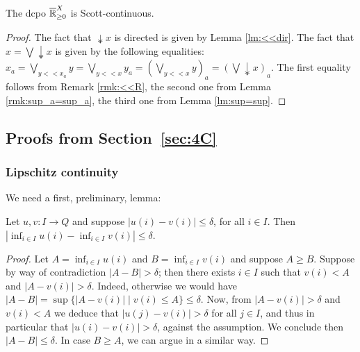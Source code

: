 \begin{corollary}
 The dcpo $\overline{\mathbb{R}}_{\geq 0}^X$ is Scott-continuous.
\end{corollary}
\begin{proof}
 The fact that $\twoheaddownarrow x$ is directed is given by Lemma \ref{lm:<<dir}. The fact that $x=\bigvee \twoheaddownarrow x$ is given by the following equalities:
 $x_a=\bigvee\limits_{y<<x_a} y = \bigvee\limits_{y<<x} y_a = \left(\bigvee\limits_{y<<x} y\right)_a=\left(\bigvee \twoheaddownarrow x\right)_a$.
 The first equality follows from Remark \ref{rmk:<<R}, the second one from Lemma \ref{rmk:sup_a=sup_a}, the third one from Lemma \ref{lm:sup=sup}.
\end{proof}




\subsection{Proofs from Section~\ref{sec:4C}}


\subsubsection{Lipschitz continuity}


  We need a first, preliminary, lemma:
\begin{lemma}\label{lemma:inf}
Let $u,v: I\to Q$ and suppose $|u(i)-v(i)|\leq \delta$, for all $i\in I$.
Then $|\inf_{i\in I}u(i)- \inf_{i\in I}v(i)|\leq \delta$. 
\end{lemma}
\begin{proof}
Let $A=\inf_{i\in I}u(i)$ and $B=\inf_{i\in I}v(i)$ and suppose $A\geq B$. 
Suppose by way of contradiction $|A-B|> \delta$; then there exists $i\in I$ such that 
$v(i)<A$ and $|A-v(i)|> \delta$. Indeed, otherwise we would have $|A-B|= \sup\{ |A-v(i)|\mid v(i)\leq A\}\leq \delta$. 
Now, from $|A-v(i)|> \delta$ and $v(i)< A$ we deduce that $|u(j)-v(i)|> \delta$ for all $j\in I$, and thus in particular that $|u(i)-v(i)|>\delta$, against the assumption. We conclude then $|A-B| \leq \delta$.
In case $B\geq A$, we can argue in a similar way. 
\end{proof}



